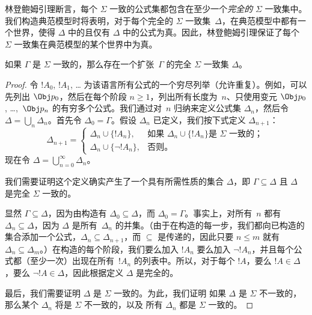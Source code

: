\documentclass[../../../include/open-logic-section]{subfiles}
\begin{document}


林登鲍姆引理断言，每个 $\Sigma$ 一致的公式集都包含在至少一个\emph{完全的} $\Sigma$ 一致集中。我们构造典范模型时将表明，对于每个完全的 $\Sigma$ 一致集~$\Delta$，在典范模型中都有一个世界，使得 $\Delta$ 中的且仅有 $\Delta$ 中的公式为真。因此，林登鲍姆引理保证了每个 $\Sigma$ 一致集在典范模型的某个世界中为真。

\begin{thm}[Lindenbaum 引理]
  如果 $\Gamma$ 是 $\Sigma$ 一致的，那么存在一个扩张~$\Gamma$ 的完全 $\Sigma$ 一致集 $\Delta$。
\end{thm}

\begin{proof}
令 $!A_0$, $!A_1$, \dots{} 为该语言所有公式的一个穷尽列举（允许重复）。例如，可以先列出 $\Obj p_0$，然后在每个阶段 $n \ge 1$，列出所有长度为~$n$、只使用变元 $\Obj p_0$, \dots,~$\Obj p_n$ 的有穷多个公式。我们通过对~$n$ 归纳来定义公式集 $\Delta_n$，然后令 $\Delta = \bigcup_n \Delta_n$。首先令 $\Delta_0 = \Gamma$。假设 $\Delta_n$ 已定义，我们按下式定义 $\Delta_{n+1}$：
\[
\Delta_{n+1} =
\begin{cases}
  \Delta_n \cup \{!A_n\}, & \text{如果 $\Delta_n \cup \{ !A_n\}$
    是 $\Sigma$ 一致的；} \\
  \Delta_n \cup \{ \lnot !A_n\}, & \text{否则。}
\end{cases}
\]
现在令 $\Delta = \bigcup_{n=0}^\infty \Delta_n$。

我们需要证明这个定义确实产生了一个具有所需性质的集合 $\Delta$，即 $\Gamma \subseteq \Delta$ 且 $\Delta$ 是完全 $\Sigma$ 一致的。

显然 $\Gamma \subseteq \Delta$，因为由构造有 $\Delta_0 \subseteq \Delta$，而 $\Delta_0 = \Gamma$。事实上，对所有~$n$ 都有 $\Delta_n \subseteq \Delta$，因为 $\Delta$ 是所有~$\Delta_n$ 的并集。（由于在构造的每一步，我们都向已构造的集合添加一个公式，$\Delta_n \subseteq
\Delta_{n+1}$，而 $\subseteq$ 是传递的，因此只要 $n \le m$ 就有 $\Delta_n \subseteq \Delta_{m}$。）在构造的每个阶段，我们要么加入 $!A_n$ 要么加入 $\lnot !A_n$，并且每个公式都（至少一次）出现在所有~$!A_n$ 的列表中。所以，对于每个 $!A$，要么 $!A \in \Delta$，要么 $\lnot !A \in \Delta$，因此根据定义 $\Delta$ 是完全的。

最后，我们需要证明 $\Delta$ 是 $\Sigma$ 一致的。为此，我们证明 如果 $\Delta$ 是 $\Sigma$ 不一致的，那么某个 $\Delta_n$ 将是 $\Sigma$ 不一致的，以及 所有 $\Delta_n$ 都是 $\Sigma$ 一致的。


\end{proof}
\end{document}
